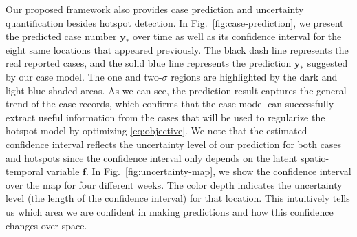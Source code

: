 \documentclass[journal]{IEEEtran}
\begin{document}
Our proposed framework also provides case prediction and uncertainty quantification besides hotspot detection.
In Fig.~\ref{fig:case-prediction}, we present the predicted case number $\mathbf{y}_*$ over time as well as its confidence interval for the eight same locations that appeared previously. 
The black dash line represents the real reported cases, and the solid blue line represents the prediction $\mathbf{y}_*$ suggested by our case model. The one and two-$\sigma$ regions are highlighted by the dark and light blue shaded areas. 
As we can see, the prediction result captures the general trend of the case records, which confirms that the case model can successfully extract useful information from the cases that will be used to regularize the hotspot model by optimizing \eqref{eq:objective}.
We note that the estimated confidence interval reflects the uncertainty level of our prediction for both cases and hotspots since the confidence interval only depends on the latent spatio-temporal variable $\mathbf{f}$. 
In Fig.~\ref{fig:uncertainty-map}, we show the confidence interval over the map for four different weeks. The color depth indicates the uncertainty level (the length of the confidence interval) for that location. This intuitively tells us which area we are confident in making predictions and how this confidence changes over space. 
\end{document}
